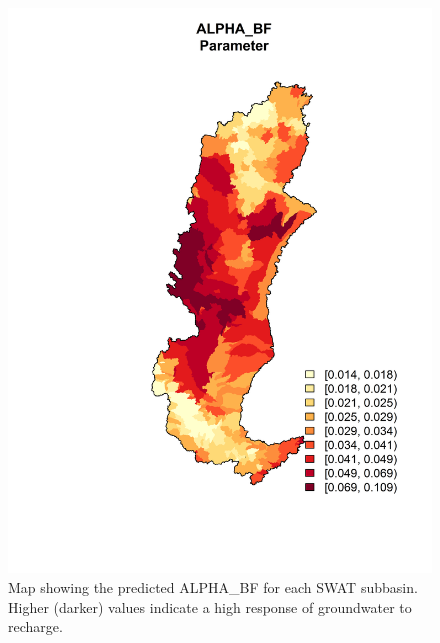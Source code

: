 \begin{figure}[h!]
	\centering
	\includegraphics[width=\textwidth]{./img/alpha_bf.png}
	\caption{Map showing the predicted ALPHA\_BF for each SWAT subbasin. Higher (darker) values indicate a high response of groundwater to recharge.}
	\label{fig:alpha_bf}
\end{figure}


